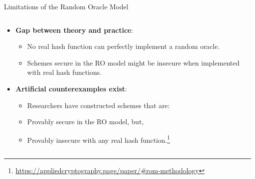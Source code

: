 \documentclass[aspectratio=169, lualatex, handout]{beamer}
\begin{document}
\begin{frame}{Limitations of the Random Oracle Model}
	\begin{columns}
		\begin{column}{1\textwidth}
			\begin{itemize}[<+->]
				\item \textbf{Gap between theory and practice}:
				      \begin{itemize}
					      \item No real hash function can perfectly implement a random oracle.
					      \item Schemes secure in the RO model might be insecure when implemented with real hash functions.
				      \end{itemize}
				\item \textbf{Artificial counterexamples exist}:
				      \begin{itemize}
					      \item Researchers have constructed schemes that are:
					      \item Provably secure in the RO model, but,
					      \item Provably insecure with any real hash function.\footnote{\url{https://appliedcryptography.page/paper/\#rom-methodology}}
				      \end{itemize}
			\end{itemize}
		\end{column}
	\end{columns}
\end{frame}

\begin{frame}[plain]
	\titlepage
\end{frame}
\end{document}
